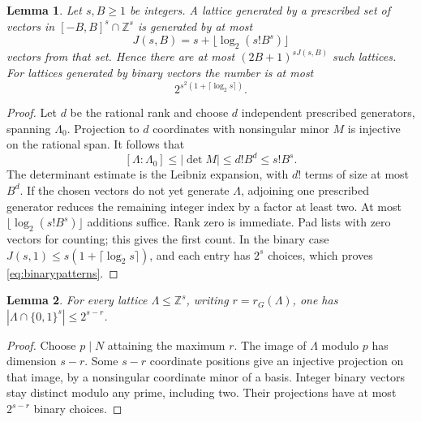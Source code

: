 \documentclass[11pt]{amsart}
\newtheorem{lemma}{Lemma}
\theoremstyle{remark}
\newcommand{\Z}{\mathbb Z}
\begin{document}
\begin{lemma}\label{lem:coarse}
Let $s,B\ge1$ be integers. A lattice generated by a prescribed set of
vectors in $[-B,B]^s\cap\Z^s$ is generated by at most
\[
 J(s,B)=s+\lfloor\log_2(s!B^s)\rfloor
\]
vectors from that set. Hence there are at most
$(2B+1)^{sJ(s,B)}$ such lattices. For lattices generated by binary
vectors the number is at most
\begin{equation}\label{eq:binarypatterns}
 2^{s^2(1+\lceil\log_2s\rceil)}.
\end{equation}
\end{lemma}
\begin{proof}
Let $d$ be the rational rank and choose $d$ independent prescribed
generators, spanning $\Lambda_0$. Projection to $d$ coordinates with
nonsingular minor $M$ is injective on the rational span. It follows that
\[
 [\Lambda:\Lambda_0]\le|\det M|\le d!B^d\le s!B^s.
\]
The determinant estimate is the Leibniz expansion, with $d!$ terms
of size at most $B^d$. If the chosen vectors do not yet generate
$\Lambda$, adjoining one prescribed generator reduces the remaining
integer index by a factor at least two. At most
$\lfloor\log_2(s!B^s)\rfloor$ additions suffice. Rank zero is immediate.
Pad lists with zero vectors for counting; this gives the first count.
In the binary case
$J(s,1)\le s(1+\lceil\log_2s\rceil)$, and each entry has $2^s$
choices, which proves \eqref{eq:binarypatterns}.
\end{proof}

\begin{lemma}\label{lem:cube}
For every lattice $\Lambda\le\Z^s$, writing $r=r_G(\Lambda)$, one has
$|\Lambda\cap\{0,1\}^s|\le2^{s-r}$.
\end{lemma}
\begin{proof}
Choose $p\mid N$ attaining the maximum $r$. The image of $\Lambda$
modulo $p$ has dimension $s-r$. Some $s-r$ coordinate positions give
an injective projection on that image, by a nonsingular coordinate
minor of a basis. Integer binary vectors stay distinct modulo any prime,
including two. Their projections have at most $2^{s-r}$ binary choices.
\end{proof}
\end{document}
